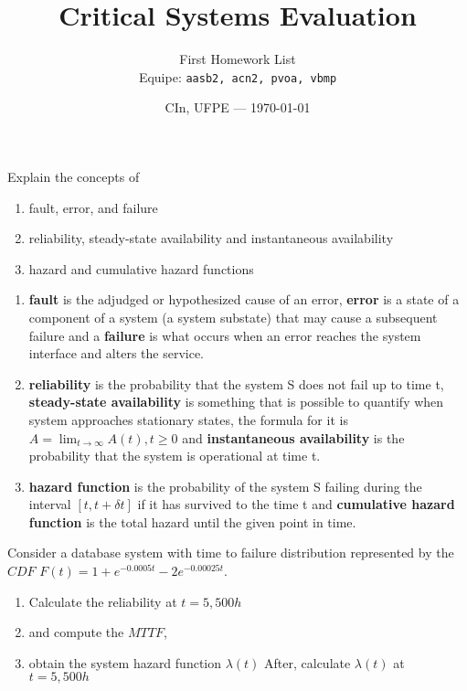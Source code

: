 \documentclass{article}
\title{Critical Systems Evaluation} %
\author{First Homework List\\ Equipe: \texttt{aasb2, acn2, pvoa, vbmp}} %
\date{CIn, UFPE --- \today} %
\begin{document}
\maketitle %

\begin{question}
    Explain the concepts of 
    \begin{enumerate}[{(a)}]
        \item fault, error, and failure
        \item reliability, steady-state availability and instantaneous availability
        \item  hazard and cumulative hazard functions
    \end{enumerate}
\end{question}

\begin{enumerate}[{(a)}]
    \item \textbf{fault} is the adjudged or hypothesized cause of an error, \textbf{error} is a state of a component of a system (a system substate) that may cause a subsequent failure and a \textbf{failure} is what occurs when an error reaches the system interface and alters the service.
    \item \textbf{reliability} is the probability that the system S does not fail up to time t, \textbf{steady-state availability} is something that is possible to quantify when system approaches stationary states, the formula for it is $A=\lim_{t \to \infty} A(t), t\ge0$ and \textbf{instantaneous availability} is the probability that the system is operational at time t.
    \item \textbf{hazard function} is the probability of the system S failing during the interval $[t,t+\delta t]$ if it has survived to the time t and \textbf{cumulative hazard function} is the total hazard until the given point in time.
\end{enumerate}
    
\begin{question}
Consider a database system with time to failure distribution represented
by the $CDF$ $F(t)=1+e^{-0.0005t}-2e^{-0.00025t}$.  
    \begin{enumerate}[{(a)}]
        \item Calculate the reliability at $t=5,500h$ 
        \item and compute the $MTTF$,
        \item obtain the system hazard function $\lambda(t)$  After, calculate $\lambda(t)$ at $t=5,500h$
    \end{enumerate}
\end{question}
\end{document}

